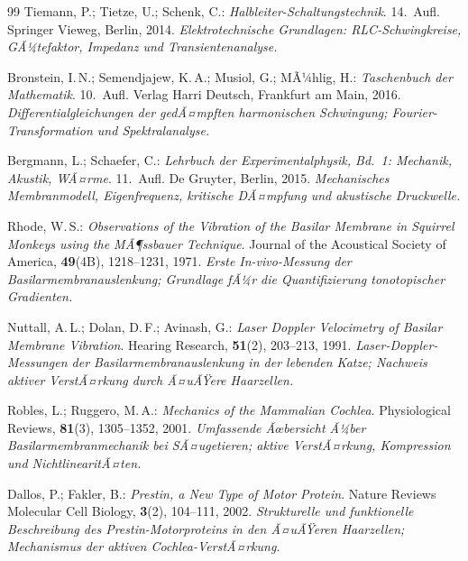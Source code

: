 ﻿\documentclass[12pt,a4paper,titlepage]{report}
\begin{document}
\begin{thebibliography}{99}
Tiemann, P.; Tietze, U.; Schenk, C.:
\textit{Halbleiter-Schaltungstechnik}. 14.~Aufl.
Springer Vieweg, Berlin, 2014.
\newline\textit{Elektrotechnische Grundlagen: RLC-Schwingkreise, GÃ¼tefaktor,
Impedanz und Transientenanalyse.}

Bronstein, I.\,N.; Semendjajew, K.\,A.; Musiol, G.; MÃ¼hlig, H.:
\textit{Taschenbuch der Mathematik}. 10.~Aufl.
Verlag Harri Deutsch, Frankfurt am Main, 2016.
\newline\textit{Differentialgleichungen der gedÃ¤mpften harmonischen Schwingung;
Fourier-Transformation und Spektralanalyse.}

Bergmann, L.; Schaefer, C.:
\textit{Lehrbuch der Experimentalphysik, Bd.~1: Mechanik, Akustik, WÃ¤rme}.
11.~Aufl. De Gruyter, Berlin, 2015.
\newline\textit{Mechanisches Membranmodell, Eigenfrequenz, kritische DÃ¤mpfung
und akustische Druckwelle.}

Rhode, W.\,S.:
\textit{Observations of the Vibration of the Basilar Membrane in Squirrel
Monkeys using the MÃ¶ssbauer Technique}.
Journal of the Acoustical Society of America, \textbf{49}(4B), 1218--1231, 1971.
\newline\textit{Erste In-vivo-Messung der Basilarmembranauslenkung; Grundlage fÃ¼r
die Quantifizierung tonotopischer Gradienten.}

Nuttall, A.\,L.; Dolan, D.\,F.; Avinash, G.:
\textit{Laser Doppler Velocimetry of Basilar Membrane Vibration}.
Hearing Research, \textbf{51}(2), 203--213, 1991.
\newline\textit{Laser-Doppler-Messungen der Basilarmembranauslenkung in der
lebenden Katze; Nachweis aktiver VerstÃ¤rkung durch Ã¤uÃŸere Haarzellen.}

Robles, L.; Ruggero, M.\,A.:
\textit{Mechanics of the Mammalian Cochlea}.
Physiological Reviews, \textbf{81}(3), 1305--1352, 2001.
\newline\textit{Umfassende Ãœbersicht Ã¼ber Basilarmembranmechanik bei SÃ¤ugetieren;
aktive VerstÃ¤rkung, Kompression und NichtlinearitÃ¤ten.}

Dallos, P.; Fakler, B.:
\textit{Prestin, a New Type of Motor Protein}.
Nature Reviews Molecular Cell Biology, \textbf{3}(2), 104--111, 2002.
\newline\textit{Strukturelle und funktionelle Beschreibung des Prestin-Motorproteins
in den Ã¤uÃŸeren Haarzellen; Mechanismus der aktiven Cochlea-VerstÃ¤rkung.}


\end{thebibliography}
\end{document}
